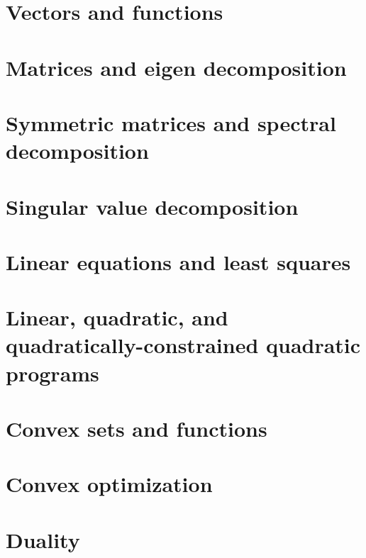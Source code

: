 \documentclass{tufte-book} %
\theoremstyle{definition}
\theoremstyle{remark}
\numberwithin{section}{chapter}
\numberwithin{equation}{chapter}
\numberwithin{figure}{chapter}
\begin{document}
\chapter{Vectors and functions}
\label{ch.vecFunc}




\chapter{Matrices and eigen decomposition}
\label{ch.matEig}



\chapter{Symmetric matrices and spectral decomposition}
\label{ch.symmMat}



\chapter{Singular value decomposition}
\label{ch.SVD}


\chapter{Linear equations and least squares}
\label{ch.linEqLS}


\chapter{Linear, quadratic, and quadratically-constrained quadratic programs}
\label{ch.linQuadGeom}


\chapter{Convex sets and functions}
\label{ch.convex}


\chapter{Convex optimization}
\label{ch.convex}


\chapter{Duality}
\label{ch.convex}

\end{document}
